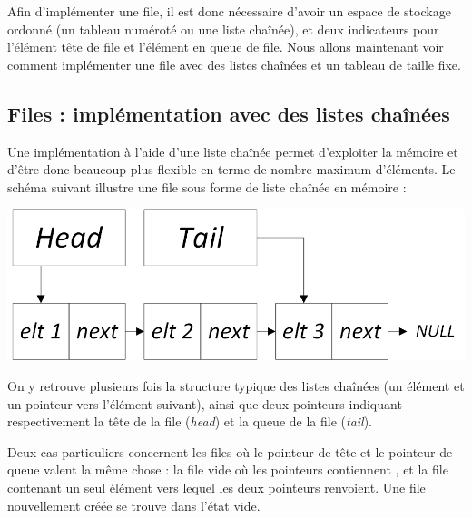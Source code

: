 Afin d'implémenter une file, il est donc nécessaire d'avoir un espace de stockage ordonné (un tableau numéroté ou une liste chaînée), et deux indicateurs pour l'élément tête de file et l'élément en queue de file.
Nous allons maintenant voir comment implémenter une file avec des listes chaînées et un tableau de taille fixe.

\bigskip


\subsection{Files : implémentation avec des listes chaînées}

\bigskip

Une implémentation à l'aide d'une liste chaînée permet d'exploiter la mémoire et d'être donc beaucoup plus flexible en terme de nombre maximum d'éléments.
Le schéma suivant illustre une file sous forme de liste chaînée en mémoire :\\

\begin{center}
\includegraphics[scale=0.75]{Cours/Files_3_Liste_Chainee_Structure_cas_general.png}
\end{center}

\smallskip

On y retrouve plusieurs fois la structure typique des listes chaînées (un élément et un pointeur vers l'élément suivant), ainsi que deux pointeurs indiquant respectivement la tête de la file (\textit{head}) et la queue de la file (\textit{tail}).

Deux cas particuliers concernent les files où le pointeur de tête et le pointeur de queue valent la même chose : la file vide où les pointeurs contiennent , et la file contenant un seul élément vers lequel les deux pointeurs renvoient.
Une file nouvellement créée se trouve dans l'état vide.\\

